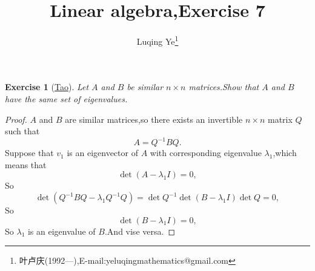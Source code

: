 ﻿\documentclass[a4paper]{article}
\newtheorem*{exe}{Exercise}
\newenvironment{exercise}
{\bigskip\begin{mdframed}\begin{exe}}
    {\end{exe}\end{mdframed}\bigskip}
\begin{document}
\title{\huge{\bf{Linear algebra,Exercise 7}}} \author{\small{Luqing Ye\footnote{叶卢庆(1992---),E-mail:yeluqingmathematics@gmail.com}}}
\maketitle
\begin{exercise}[\href{http://www.math.ucla.edu/~tao/resource/general/115a.3.02f/assign7.pdf}{Tao}]
 Let $A$ and $B$ be similar $n\times n$ matrices.Show that $A$ and $B$
 have the same set of eigenvalues.
\end{exercise}
\begin{proof}
  $A$ and $B$ are similar matrices,so there exists an invertible
  $n\times n$ matrix $Q$ such that 
$$
A=Q^{-1}BQ.
$$
Suppose that $v_1$ is an eigenvector of $A$ with corresponding
eigenvalue $\lambda_1$,which means that
$$
\det(A-\lambda_1I)=0,
$$
So
$$
\det (Q^{-1}BQ-\lambda_1Q^{-1}Q)=\det Q^{-1}\det(B-\lambda_1I)\det Q=0,
$$
So
$$
\det(B-\lambda_1I)=0,
$$
So $\lambda_1$ is an eigenvalue of $B$.And vise versa.
\end{proof}
\end{document}

